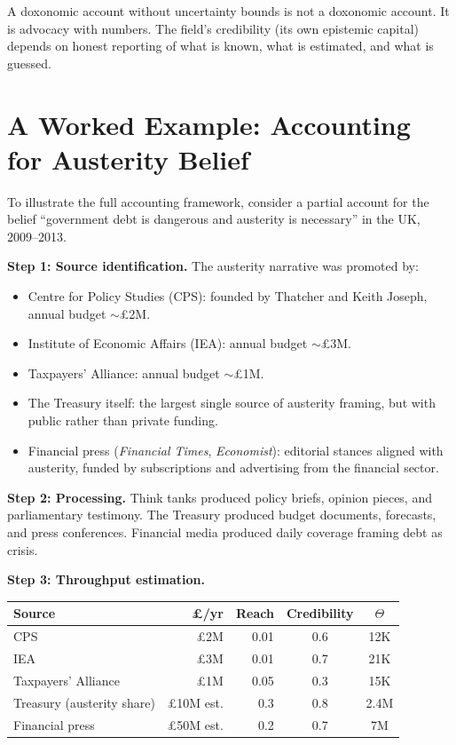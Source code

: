\begin{principle}
\label{prin:honest-accounting}
A doxonomic account without uncertainty bounds is not a doxonomic account.
It is advocacy with numbers.
The field's credibility (its own epistemic capital) depends on honest reporting of what is known, what is estimated, and what is guessed.
\end{principle}


\section{A Worked Example: Accounting for Austerity Belief}
\label{sec:ch14-austerity}

To illustrate the full accounting framework, consider a partial account for the belief ``government debt is dangerous and austerity is necessary'' in the UK, 2009--2013.

\textbf{Step 1: Source identification.}
The austerity narrative was promoted by:
\begin{itemize}[nosep]
  \item Centre for Policy Studies (CPS): founded by Thatcher and Keith Joseph, annual budget $\sim$\pounds2M.
  \item Institute of Economic Affairs (IEA): annual budget $\sim$\pounds3M.
  \item Taxpayers' Alliance: annual budget $\sim$\pounds1M.
  \item The Treasury itself: the largest single source of austerity framing, but with public rather than private funding.
  \item Financial press (\textit{Financial Times}, \textit{Economist}): editorial stances aligned with austerity, funded by subscriptions and advertising from the financial sector.
\end{itemize}

\textbf{Step 2: Processing.}
Think tanks produced policy briefs, opinion pieces, and parliamentary testimony.
The Treasury produced budget documents, forecasts, and press conferences.
Financial media produced daily coverage framing debt as crisis.

\textbf{Step 3: Throughput estimation.}
\begin{center}
\begin{tabular}{lrrcc}
\toprule
\textbf{Source} & \textbf{\pounds/yr} & \textbf{Reach} & \textbf{Credibility} & \textbf{$\Theta$} \\
\midrule
CPS & \pounds2M & 0.01 & 0.6 & 12K \\
IEA & \pounds3M & 0.01 & 0.7 & 21K \\
Taxpayers' Alliance & \pounds1M & 0.05 & 0.3 & 15K \\
Treasury (austerity share) & \pounds10M est. & 0.3 & 0.8 & 2.4M \\
Financial press & \pounds50M est. & 0.2 & 0.7 & 7M \\
\bottomrule
\end{tabular}
\end{center}

